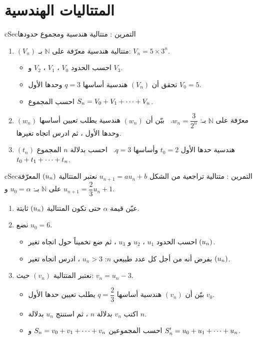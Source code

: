 \documentclass[12pt,a4paper]{article}
\newenvironment{BOX}[2]{\begin{otherlanguage}{english}\begin{arbox}{#1}{#2}}{\end{arbox}\end{otherlanguage}}
\newcounter{exo}
\newenvironment{tamrin}[1]{\stepcounter{exo}\begin{BOX}{cSec}{التمرين \theexo: #1}}{\end{BOX}}
\renewcommand{\cdots}{\mathinner{\cdotp\cdotp\cdotp}}
\newcommand{\N}{\mathbb{N}}
\newenvironment{sq}{\begin{itemize}[leftmargin=2.4em,itemsep=3pt]}{\end{itemize}}
\newcommand{\qa}{\item[(أ)]}\newcommand{\qb}{\item[(ب)]}\newcommand{\qc}{\item[(جـ)]}\newcommand{\qd}{\item[(د)]}\newcommand{\qe}{\item[(هـ)]}
\begin{document}
\section{المتتاليات الهندسية}
\begin{tamrin}{متتالية هندسية ومجموع حدودها}
\begin{enumerate}
\item $(V_n)$ متتالية هندسية معرّفة على $\N$ بـ: $V_n=5\times3^n$.
\begin{sq}
\qa احسب الحدود $V_0$ ، $V_1$ ، $V_2$ و $V_3$.
\qb تحقق أن $(V_n)$ هندسية أساسها $q=3$ وحدها الأول $V_0=5$.
\qc احسب المجموع $S_n=V_0+V_1+\cdots+V_n$.
\end{sq}
\item $(w_n)$ معرّفة على $\N$ بـ: $w_n=\dfrac{3}{2^n}$. \ بيّن أن $(w_n)$ هندسية يطلب تعيين أساسها وحدها الأول ، ثم ادرس اتجاه تغيرها.
\item $(t_n)$ هندسية حدها الأول $t_0=2$ وأساسها $q=3$. \ احسب بدلالة $n$ المجموع $t_0+t_1+\cdots+t_n$.
\end{enumerate}
\end{tamrin}

\begin{tamrin}{متتالية تراجعية من الشكل $u_{n+1}=au_n+b$}
نعتبر المتتالية $(u_n)$ المعرّفة على $\N$ بـ: $u_0=\alpha$ و $u_{n+1}=\dfrac23u_n+1$.
\begin{enumerate}
\item عيّن قيمة $\alpha$ حتى تكون المتتالية $(u_n)$ ثابتة.
\item نضع $u_0=6$.
\begin{sq}
\qa احسب الحدود $u_1$ ، $u_2$ و $u_3$ ، ثم ضع تخميناً حول اتجاه تغير $(u_n)$.
\qb بفرض أنه من أجل كل عدد طبيعي $n$: $u_n>3$ ، ادرس اتجاه تغير $(u_n)$.
\end{sq}
\item نعتبر المتتالية $(v_n)$ حيث: $v_n=u_n-3$.
\begin{sq}
\qa بيّن أن $(v_n)$ هندسية أساسها $q=\dfrac23$ يطلب تعيين حدها الأول $v_0$.
\qb اكتب $v_n$ بدلالة $n$ ، ثم استنتج $u_n$ بدلالة $n$.
\qc احسب المجموعين $S_n=v_0+v_1+\cdots+v_n$ و $S'_n=u_0+u_1+\cdots+u_n$.
\end{sq}
\end{enumerate}
\end{tamrin}
\end{document}
